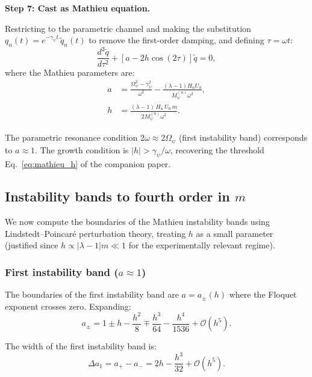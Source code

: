 \documentclass[12pt,aps,prd,twocolumn,superscriptaddress,nofootinbib]{revtex4-2}
\newcommand{\Opsi}{\Omega_\psi}
\newcommand{\gpsi}{\gamma_\psi}
\newcommand{\Mpsi}{M_\psi}
\begin{document}
\textbf{Step 7: Cast as Mathieu equation.}

Restricting to the parametric channel and making the substitution
$q_n(t) = e^{-\gpsi t}\,\tilde{q}_n(t)$ to remove the first-order
damping, and defining $\tau = \omega t$:
\begin{equation}
\boxed{
\frac{d^2\tilde{q}}{d\tau^2}
+ \left[a - 2h\cos(2\tau)\right]\tilde{q} = 0,
}
\label{eq:mathieu}
\end{equation}
where the Mathieu parameters are:
\begin{align}
a &= \frac{\Opsi^2 - \gpsi^2}{\omega^2}
- \frac{(\lambda-1)H_n U_0}{\Mpsi^{(n)}\omega^2},
\label{eq:mathieu_a}\\
h &= \frac{(\lambda-1)\,H_n\,U_0\,m}{2\Mpsi^{(n)}\omega^2}.
\label{eq:mathieu_h}
\end{align}

The parametric resonance condition $2\omega \approx 2\Opsi$ (first
instability band) corresponds to $a \approx 1$. The growth condition
is $|h| > \gpsi/\omega$, recovering the threshold
Eq.~\eqref{eq:mathieu_h} of the companion paper.

\subsection{Instability bands to fourth order in $m$}
\label{sec:instability_bands}

We now compute the boundaries of the Mathieu instability bands using
Lindstedt--Poincar\'e perturbation theory, treating $h$ as a small
parameter (justified since $h \propto |\lambda-1|m \ll 1$ for
the experimentally relevant regime).

\subsubsection{First instability band ($a \approx 1$)}

The boundaries of the first instability band are
$a = a_\pm(h)$ where the Floquet exponent crosses zero.
Expanding:
\begin{equation}
a_\pm = 1 \pm h - \frac{h^2}{8} \mp \frac{h^3}{64}
- \frac{h^4}{1536} + \mathcal{O}(h^5).
\label{eq:band1}
\end{equation}

The width of the first instability band is:
\begin{equation}
\Delta a_1 = a_+ - a_- = 2h - \frac{h^3}{32}
+ \mathcal{O}(h^5).
\label{eq:width1}
\end{equation}
\end{document}
